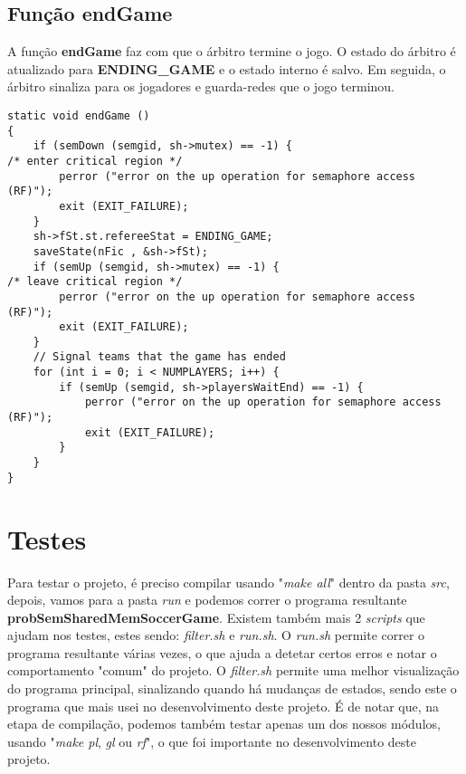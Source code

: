 \documentclass[code,math]{relatorio-deti}
\begin{document}
\section{Função \textbf{endGame}}

A função \textbf{endGame} faz com que o árbitro termine o jogo. O estado do árbitro é atualizado para \textbf{ENDING\_GAME} e o estado interno é salvo. Em seguida, o árbitro sinaliza para os jogadores e guarda-redes que o jogo terminou.

\begin{verbatim}
static void endGame ()
{
    if (semDown (semgid, sh->mutex) == -1) {                                                      /* enter critical region */
        perror ("error on the up operation for semaphore access (RF)");
        exit (EXIT_FAILURE);
    }
    sh->fSt.st.refereeStat = ENDING_GAME;
    saveState(nFic , &sh->fSt);
    if (semUp (semgid, sh->mutex) == -1) {                                                        /* leave critical region */
        perror ("error on the up operation for semaphore access (RF)");
        exit (EXIT_FAILURE);
    }
    // Signal teams that the game has ended
    for (int i = 0; i < NUMPLAYERS; i++) {
        if (semUp (semgid, sh->playersWaitEnd) == -1) {
            perror ("error on the up operation for semaphore access (RF)");
            exit (EXIT_FAILURE);
        }
    }
}
\end{verbatim}

\chapter{Testes}

Para testar o projeto, é preciso compilar usando "\textit{make all}" dentro da pasta \textit{src}, depois, vamos para a pasta \textit{run} e podemos correr o programa resultante \textbf{probSemSharedMemSoccerGame}. Existem também mais 2 \textit{scripts} que ajudam nos testes, estes sendo: \textit{filter.sh} e \textit{run.sh}. O \textit{run.sh} permite correr o programa resultante várias vezes, o que ajuda a detetar certos erros e notar o comportamento "comum" do projeto. O \textit{filter.sh} permite uma melhor visualização do programa principal, sinalizando quando há mudanças de estados, sendo este o programa que mais usei no desenvolvimento deste projeto. É de notar que, na etapa de compilação, podemos também testar apenas um dos nossos módulos, usando "\textit{make pl}, \textit{gl} ou \textit{rf}", o que foi importante no desenvolvimento deste projeto.
\end{document}
